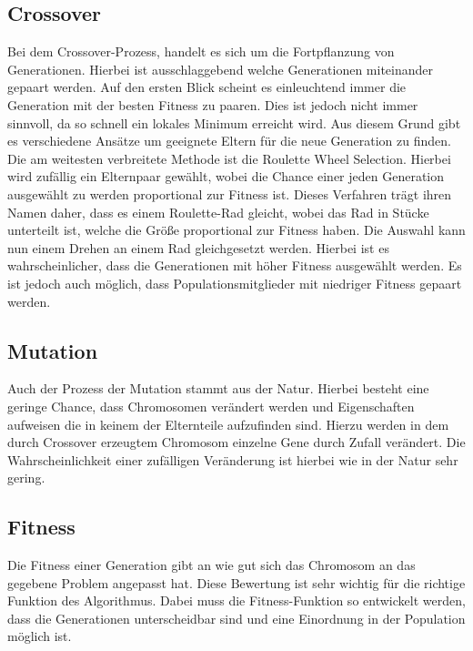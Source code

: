 \subsection{Crossover}
Bei dem Crossover-Prozess, handelt es sich um die Fortpflanzung von Generationen. Hierbei ist ausschlaggebend welche Generationen miteinander gepaart werden. Auf den ersten Blick scheint es einleuchtend immer die Generation mit der besten Fitness zu paaren. Dies ist jedoch nicht immer sinnvoll, da so schnell ein lokales Minimum erreicht wird. Aus diesem Grund gibt es verschiedene Ansätze um geeignete Eltern für die neue Generation zu finden. Die am weitesten verbreitete Methode ist die Roulette Wheel Selection. Hierbei wird zufällig ein Elternpaar gewählt, wobei die Chance einer jeden Generation ausgewählt zu werden proportional zur Fitness ist. Dieses Verfahren trägt ihren Namen daher, dass es einem Roulette-Rad gleicht, wobei das Rad in Stücke unterteilt ist, welche die Größe proportional zur Fitness haben. Die Auswahl kann nun einem Drehen an einem Rad gleichgesetzt werden. Hierbei ist es wahrscheinlicher, dass die Generationen mit höher Fitness ausgewählt werden. Es ist jedoch auch möglich, dass Populationsmitglieder mit niedriger Fitness gepaart werden.

\subsection{Mutation}
Auch der Prozess der Mutation stammt aus der Natur. Hierbei besteht eine geringe Chance, dass Chromosomen verändert werden und Eigenschaften aufweisen die in keinem der Elternteile aufzufinden sind. Hierzu werden in dem durch Crossover erzeugtem Chromosom einzelne Gene durch Zufall verändert. Die Wahrscheinlichkeit einer zufälligen Veränderung ist hierbei wie in der Natur sehr gering.
\subsection{Fitness}
Die Fitness einer Generation gibt an wie gut sich das Chromosom an das gegebene Problem angepasst hat. Diese Bewertung ist sehr wichtig für die richtige Funktion des Algorithmus. Dabei muss die Fitness-Funktion so entwickelt werden, dass die Generationen unterscheidbar sind und eine Einordnung in der Population möglich ist.  
